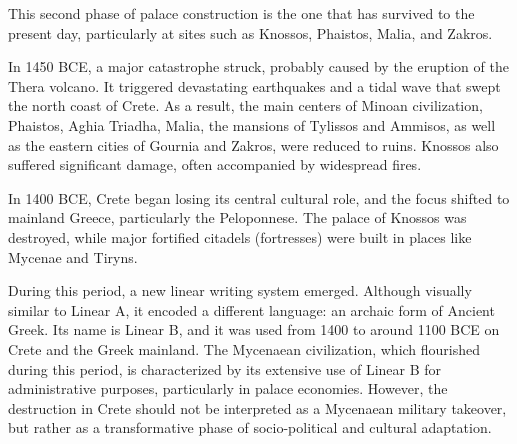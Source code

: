 This second phase of palace construction is the one that has survived to the present day, particularly at sites such as Knossos, Phaistos, Malia, and Zakros.

In 1450 BCE, a major catastrophe struck, probably caused by the eruption of the Thera volcano.
It triggered devastating earthquakes and a tidal wave that swept the north coast of Crete.
As a result, the main centers of Minoan civilization, Phaistos, Aghia Triadha, Malia, the mansions of Tylissos and Ammisos, as well as the eastern cities of Gournia and Zakros, were reduced to ruins.
Knossos also suffered significant damage, often accompanied by widespread fires. \cite{alexiou-ch4}

In 1400 BCE, Crete began losing its central cultural role, and the focus shifted to mainland Greece, particularly the Peloponnese.
The palace of Knossos was destroyed, while major fortified citadels (fortresses) were built in places like Mycenae and Tiryns. \cite{alexiou-ch5}

During this period, a new linear writing system emerged.
Although visually similar to Linear A, it encoded a different language: an archaic form of Ancient Greek.
Its name is Linear B, and it was used from 1400 to around 1100 BCE on Crete and the Greek mainland.
The Mycenaean civilization, which flourished during this period, is characterized by its extensive use of Linear B for administrative purposes, particularly in palace economies.
However, the destruction in Crete should not be interpreted as a Mycenaean military takeover, but rather as a transformative phase of socio-political and cultural adaptation. \cite{salg-ch5}


